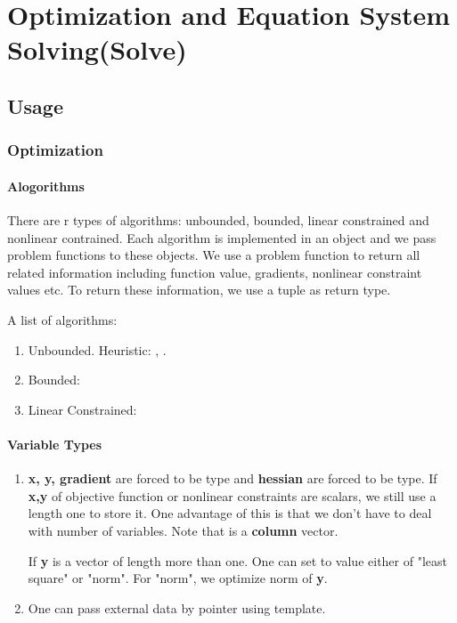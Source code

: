 \chapter{Optimization and Equation System Solving(Solve)}
\section{Usage}

\subsection{Optimization}
\subsubsection{Alogorithms}
There are r types of algorithms: unbounded, bounded, linear constrained and nonlinear contrained. Each algorithm is implemented in an object and we pass problem functions to these objects. We use a problem function to return all related information including function value, gradients, nonlinear constraint values etc. To return these information, we use a tuple as return type.

A list of algorithms:

\begin{enumerate}
	\item Unbounded. Heuristic: ,  .
	\item Bounded: 
	\item Linear Constrained: 
\end{enumerate}

\subsubsection{Variable Types}
\begin{enumerate}
	\item \textbf{x, y, gradient} are forced to be  type and \textbf{hessian} are forced to be  type. If \textbf{x,y} of objective function or nonlinear constraints are scalars, we still use a length one  to store it. One advantage of this is that we don't have to deal with number of variables. Note that  is a \textbf{column} vector.
	
	If \textbf{y} is a vector of length more than one. One can set  to value either of "least square" or "norm". For "norm", we optimize norm of \textbf{y}.
	
	\item One can pass external data by pointer using template.
\end{enumerate}

